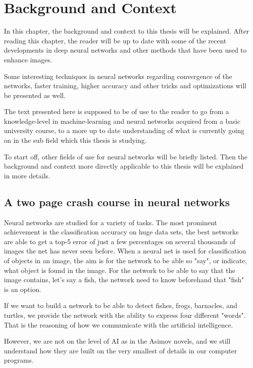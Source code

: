 \chapter{Background and Context}\label{cha:cont}

%
In this chapter, the background and context to this thesis will be explained. After reading this chapter, the reader will be up to date with some of the recent developments in deep neural networks and other methods that have been used to enhance images. 

Some interesting techniques in neural networks regarding convergence of the networks, faster training, higher accuracy and other tricks and optimizations will be presented as well.

The text presented here is supposed to be of use to the reader to go from a knowledge-level in machine-learning and neural networks acquired from a basic university course, to a more up to date understanding of what is currently going on in the sub field which this thesis is studying. 

To start off, other fields of use for neural networks will be briefly listed. Then the background and context more directly applicable to this thesis will be explained in more details. 

\section{A two page crash course in neural networks}
Neural networks are studied for a variety of tasks. The most prominent achievement is the classification accuracy on huge data sets, the best networks are able to get a top-5 error of just a few percentages on several thousands of images the net has never seen before. When a neural net is used for classification of objects in an image, the aim is for the network to be able so "say", or indicate, what object is found in the image. For the network to be able to say that the image contains, let's say a fish, the network need to know beforehand that "fish" is an option.

If we want to build a network to be able to detect fishes, frogs, barnacles, and turtles, we provide the network with the ability to express four different "words". That is the reasoning of how we communicate with the artificial intelligence. 

However, we are not on the level of AI as in the Asimov novels, and we still understand how they are built on the very smallest of details in our computer programs. 

